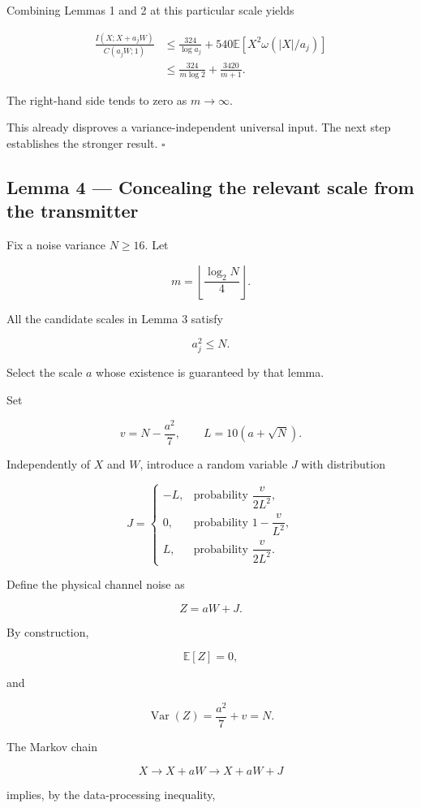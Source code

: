 \documentclass[11pt]{article}
\begin{document}
Combining Lemmas 1 and 2 at this particular scale yields

\[
\begin{aligned}
\frac{I(X;X+a_jW)}{C(a_jW;1)}
&\leq
\frac{324}{\log a_j}
+540\mathbb E[X^2\omega(|X|/a_j)]\\
&\leq
\frac{324}{m\log2}
+\frac{3420}{m+1}.
\end{aligned}
\]

The right-hand side tends to zero as \(m\to\infty\).

This already disproves a variance-independent universal input. The next step establishes the stronger result. \(\square\)

\subsection{Lemma 4 --- Concealing the relevant scale from the transmitter}

Fix a noise variance \(N\geq16\). Let

\[
m=\left\lfloor\frac{\log_2N}{4}\right\rfloor.
\]

All the candidate scales in Lemma 3 satisfy

\[
a_j^2\leq N.
\]

Select the scale \(a\) whose existence is guaranteed by that lemma.

Set

\[
v=N-\frac{a^2}{7},
\qquad
L=10(a+\sqrt N).
\]

Independently of \(X\) and \(W\), introduce a random variable \(J\) with distribution

\[
J=
\begin{cases}
-L,&\text{probability }\dfrac{v}{2L^2},\\
0,&\text{probability }1-\dfrac{v}{L^2},\\
L,&\text{probability }\dfrac{v}{2L^2}.
\end{cases}
\]

Define the physical channel noise as

\[
Z=aW+J.
\]

By construction,

\[
\mathbb E[Z]=0,
\]

and

\[
\operatorname{Var}(Z)
=\frac{a^2}{7}+v=N.
\]

The Markov chain

\[
X\longrightarrow X+aW
\longrightarrow X+aW+J
\]

implies, by the data-processing inequality,
\end{document}
